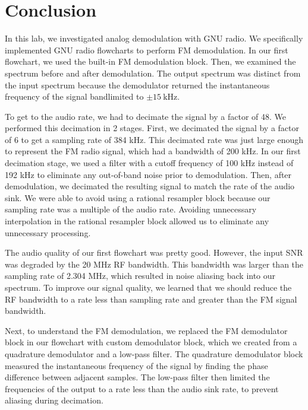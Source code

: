 \documentclass{article}
\begin{document}
\section{Conclusion}

In this lab, we investigated analog demodulation with GNU radio. We specifically implemented GNU radio flowcharts to perform FM demodulation. In our first flowchart, we used the built-in FM demodulation block. Then, we examined the spectrum before and after demodulation. The output spectrum was distinct from the input spectrum because the demodulator returned the instantaneous frequency of the signal bandlimited to $\pm 15\ \text{kHz}$.

To get to the audio rate, we had to decimate the signal by a factor of 48. We performed this decimation in 2 stages. First, we decimated the signal by a factor of 6 to get a sampling rate of 384 kHz. This decimated rate was just large enough to represent the FM radio signal, which had a bandwidth of 200 kHz. In our first decimation stage, we used a filter with a cutoff frequency of 100 kHz instead of 192 kHz to eliminate any out-of-band noise prior to demodulation. Then, after demodulation, we decimated the resulting signal to match the rate of the audio sink. We were able to avoid using a rational resampler block because our sampling rate was a multiple of the audio rate. Avoiding unnecessary interpolation in the rational resampler block allowed us to eliminate any unnecessary processing.

The audio quality of our first flowchart was pretty good. However, the input SNR was degraded by the 20 MHz RF bandwidth. This bandwidth was larger than the sampling rate of 2.304 MHz, which resulted in noise aliasing back into our spectrum. To improve our signal quality, we learned that we should reduce the RF bandwidth to a rate less than sampling rate and greater than the FM signal bandwidth.

Next, to understand the FM demodulation, we replaced the FM demodulator block in our flowchart with custom demodulator block, which we created from a quadrature demodulator and a low-pass filter. The 	quadrature demodulator block measured the instantaneous frequency of the signal by finding the phase difference between adjacent samples. The low-pass filter then limited the frequencies of the output to a rate less than the audio sink rate, to prevent aliasing during decimation.
\end{document}
